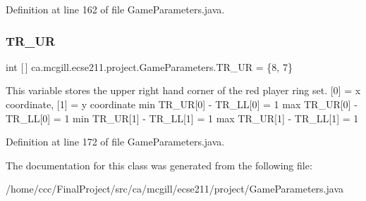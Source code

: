 Definition at line 162 of file Game\+Parameters.\+java.

\mbox{\label{classca_1_1mcgill_1_1ecse211_1_1project_1_1_game_parameters_a45c465e9f0b53a4e752a398036be13f5}} 
\subsubsection{\texorpdfstring{T\+R\+\_\+\+UR}{TR\_UR}}
{\footnotesize\ttfamily int \mbox{[}$\,$\mbox{]} ca.\+mcgill.\+ecse211.\+project.\+Game\+Parameters.\+T\+R\+\_\+\+UR = \{8, 7\}\hspace{0.3cm}{\ttfamily [static]}}

This variable stores the upper right hand corner of the red player ring set. \mbox{[}0\mbox{]} = x coordinate, \mbox{[}1\mbox{]} = y coordinate min T\+R\+\_\+\+UR\mbox{[}0\mbox{]} -\/ T\+R\+\_\+\+LL\mbox{[}0\mbox{]} = 1 max T\+R\+\_\+\+UR\mbox{[}0\mbox{]} -\/ T\+R\+\_\+\+LL\mbox{[}0\mbox{]} = 1 min T\+R\+\_\+\+UR\mbox{[}1\mbox{]} -\/ T\+R\+\_\+\+LL\mbox{[}1\mbox{]} = 1 max T\+R\+\_\+\+UR\mbox{[}1\mbox{]} -\/ T\+R\+\_\+\+LL\mbox{[}1\mbox{]} = 1 

Definition at line 172 of file Game\+Parameters.\+java.



The documentation for this class was generated from the following file\+:\begin{DoxyCompactItemize}
\item 
/home/ccc/\+Final\+Project/src/ca/mcgill/ecse211/project/Game\+Parameters.\+java\end{DoxyCompactItemize}
